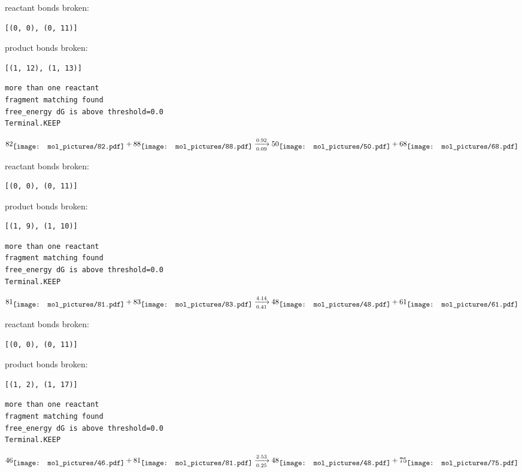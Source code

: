 \documentclass{article}
\begin{document}
reactant bonds broken:\begin{verbatim}
[(0, 0), (0, 11)]
\end{verbatim}
product bonds broken:\begin{verbatim}
[(1, 12), (1, 13)]
\end{verbatim}




\vspace{1cm}
\begin{verbatim}
more than one reactant
fragment matching found
free_energy dG is above threshold=0.0
Terminal.KEEP
\end{verbatim}
$$
82
\raisebox{-.5\height}{\texttt{[image: mol\_pictures/82.pdf]}}
+
88
\raisebox{-.5\height}{\texttt{[image: mol\_pictures/88.pdf]}}
\xrightarrow[0.09]{0.92}
50
\raisebox{-.5\height}{\texttt{[image: mol\_pictures/50.pdf]}}
+
68
\raisebox{-.5\height}{\texttt{[image: mol\_pictures/68.pdf]}}
$$


reactant bonds broken:\begin{verbatim}
[(0, 0), (0, 11)]
\end{verbatim}
product bonds broken:\begin{verbatim}
[(1, 9), (1, 10)]
\end{verbatim}




\vspace{1cm}
\begin{verbatim}
more than one reactant
fragment matching found
free_energy dG is above threshold=0.0
Terminal.KEEP
\end{verbatim}
$$
81
\raisebox{-.5\height}{\texttt{[image: mol\_pictures/81.pdf]}}
+
83
\raisebox{-.5\height}{\texttt{[image: mol\_pictures/83.pdf]}}
\xrightarrow[0.41]{4.14}
48
\raisebox{-.5\height}{\texttt{[image: mol\_pictures/48.pdf]}}
+
61
\raisebox{-.5\height}{\texttt{[image: mol\_pictures/61.pdf]}}
$$


reactant bonds broken:\begin{verbatim}
[(0, 0), (0, 11)]
\end{verbatim}
product bonds broken:\begin{verbatim}
[(1, 2), (1, 17)]
\end{verbatim}




\vspace{1cm}
\begin{verbatim}
more than one reactant
fragment matching found
free_energy dG is above threshold=0.0
Terminal.KEEP
\end{verbatim}
$$
46
\raisebox{-.5\height}{\texttt{[image: mol\_pictures/46.pdf]}}
+
81
\raisebox{-.5\height}{\texttt{[image: mol\_pictures/81.pdf]}}
\xrightarrow[0.25]{2.53}
48
\raisebox{-.5\height}{\texttt{[image: mol\_pictures/48.pdf]}}
+
75
\raisebox{-.5\height}{\texttt{[image: mol\_pictures/75.pdf]}}
$$
\end{document}
